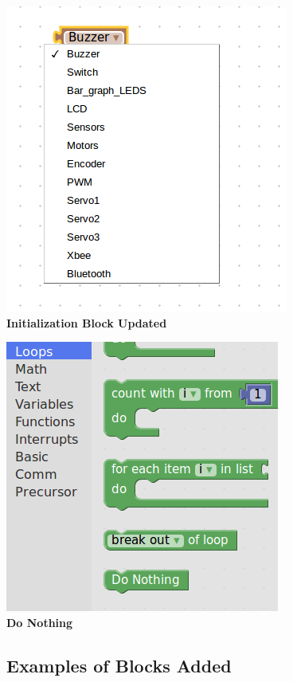 \documentclass[a4paper,12pt,oneside]{book}
\begin{document}
    \begin{center}
    \includegraphics[scale =0.6]{initb}\\[.3in]
    \textbf{Initialization Block Updated}\\[1.3in]
    \end{center}
    
    \begin{center}
    \includegraphics[scale =0.6]{Dono}\\[.3in]
    \textbf{Do Nothing}\\[1.3in]
    \end{center}
    
\newpage\begin{center}
    \section{Examples of Blocks Added}
    \end{center}
    
\end{document}
